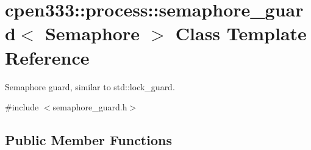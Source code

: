 \hypertarget{classcpen333_1_1process_1_1semaphore__guard}{}\section{cpen333\+:\+:process\+:\+:semaphore\+\_\+guard$<$ Semaphore $>$ Class Template Reference}
\label{classcpen333_1_1process_1_1semaphore__guard}


Semaphore guard, similar to std\+::lock\+\_\+guard.  




{\ttfamily \#include $<$semaphore\+\_\+guard.\+h$>$}

\subsection*{Public Member Functions}
